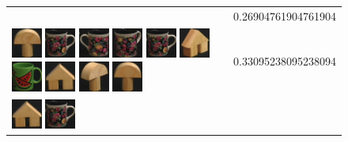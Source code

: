 \begin{figure}[tbp]
\begin{center}
\begin{tabular}{m{11cm} | m{3cm} |}
& {\scriptsize 0.26904761904761904}
\\
\includegraphics[width=1cm]{coil/beeld-0.eps}
\includegraphics[width=1cm]{coil/beeld-60.eps}
\includegraphics[width=1cm]{coil/beeld-61.eps}
\includegraphics[width=1cm]{coil/beeld-63.eps}
\includegraphics[width=1cm]{coil/beeld-60.eps}
\includegraphics[width=1cm]{coil/beeld-45.eps}
\includegraphics[width=1cm]{coil/beeld-30.eps}
\includegraphics[width=1cm]{coil/beeld-42.eps}
\includegraphics[width=1cm]{coil/beeld-3.eps}
\includegraphics[width=1cm]{coil/beeld-1.eps}
& {\scriptsize 0.33095238095238094}
\\
\includegraphics[width=1cm]{coil/beeld-42.eps}
\includegraphics[width=1cm]{coil/beeld-60.eps}

\end{tabular}
\end{center}
\end{figure}
